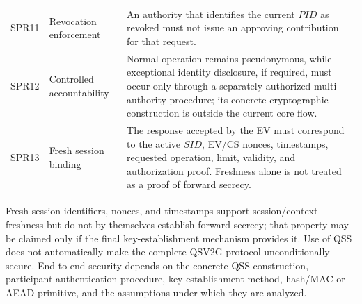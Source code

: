 \documentclass[twocolumn,10pt,journal]{IEEEtran}
\begin{document}
\begin{table}[!t]
\begin{tabular}{@{}p{}p{}p{}@{}}
SPR11 & Revocation enforcement & An authority that identifies the current $PID$ as revoked must not issue an approving contribution for that request.\\
SPR12 & Controlled accountability & Normal operation remains pseudonymous, while exceptional identity disclosure, if required, must occur only through a separately authorized multi-authority procedure; its concrete cryptographic construction is outside the current core flow.\\
SPR13 & Fresh session binding & The response accepted by the EV must correspond to the active $SID$, EV/CS nonces, timestamps, requested operation, limit, validity, and authorization proof. Freshness alone is not treated as a proof of forward secrecy.\\
\hline
\end{tabular}
\end{table}

Fresh session identifiers, nonces, and timestamps support session/context freshness but do not by themselves establish forward secrecy; that property may be claimed only if the final key-establishment mechanism provides it. Use of QSS does not automatically make the complete QSV2G protocol unconditionally secure. End-to-end security depends on the concrete QSS construction, participant-authentication procedure, key-establishment method, hash/MAC or AEAD primitive, and the assumptions under which they are analyzed.
\end{document}
